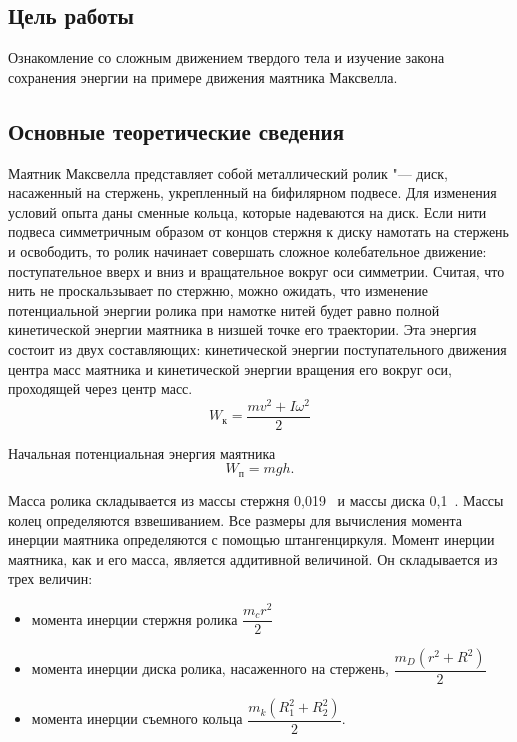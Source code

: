 \documentclass[a4paper, 12pt]{extarticle}
\begin{document}
\MTDTitlePage
\MTDInfoPage

\setcounter{section}{10}

\subsection{Цель работы}
Ознакомление со сложным движением твердого тела и изучение закона сохранения энергии на примере движения маятника Максвелла.

\subsection{Основные теоретические сведения}
Маятник Максвелла представляет собой металлический ролик "--- диск, насаженный на стержень, укрепленный на бифилярном  подвесе. Для изменения условий опыта даны сменные кольца, которые надеваются на диск. Если нити подвеса симметричным образом от концов стержня к диску намотать на стержень и освободить, то ролик начинает совершать сложное колебательное движение: поступательное вверх и вниз и вращательное вокруг оси симметрии. Считая, что нить не проскальзывает по стержню, можно ожидать, что изменение потенциальной энергии ролика при намотке нитей будет равно полной кинетической энергии маятника в низшей точке его траектории. Эта энергия состоит из двух составляющих: кинетической энергии поступательного движения центра масс маятника и кинетической энергии вращения его вокруг оси, проходящей через центр масс. %
\[ %
W_\text{к} = \frac{mv^2 + I\omega^2}{2} %
\]

Начальная потенциальная энергия маятника %
\[
W_\text{п} = mgh.
\]

Масса ролика складывается из массы стержня 0,019~ и массы диска 0,1~. Массы колец определяются взвешиванием. Все размеры для вычисления момента инерции маятника определяются с помощью штангенциркуля. Момент инерции маятника, как и его масса, является аддитивной величиной. Он складывается из трех величин: %
\begin{itemize}
\item момента инерции стержня ролика $\dfrac{m_c r^2}{2}$
\item момента инерции диска ролика, насаженного на стержень, $\dfrac{m_D (r^2 + R^2)}{2}$
\item момента инерции съемного кольца $\dfrac{m_k(R_1^2 + R_2^2)}{2}$.
\end{itemize}
\end{document}
